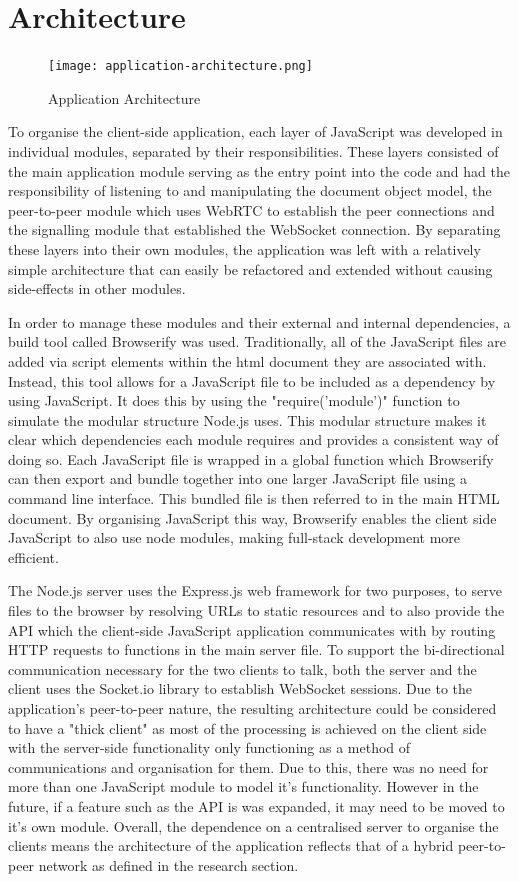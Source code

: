 \documentclass[]{report}
\begin{document}
		\section{Architecture}
			\begin{figure}[H]
				\caption{Application Architecture}
				\centering
				\texttt{[image: application-architecture.png]}
			\end{figure}
			To organise the client-side application, each layer of JavaScript was developed in individual modules, separated by their responsibilities. These layers consisted of the main application module serving as the entry point into the code and had the responsibility of listening to and manipulating the document object model, the peer-to-peer module which uses WebRTC to establish the peer connections and the signalling module that established the WebSocket connection. By separating these layers into their own modules, the application was left with a relatively simple architecture that can easily be refactored and extended without causing side-effects in other modules.
			
			In order to manage these modules and their external and internal dependencies, a build tool called Browserify was used. Traditionally, all of the JavaScript files are added via script elements within the html document they are associated with. Instead, this tool allows for a JavaScript file to be included as a dependency by using JavaScript. It does this by using the "require('module')" function to simulate the modular structure Node.js uses. This modular structure makes it clear which dependencies each module requires and provides a consistent way of doing so. Each JavaScript file is wrapped in a global function which Browserify can then export and bundle together into one larger JavaScript file using a command line interface. This bundled file is then referred to in the main HTML document. By organising JavaScript this way, Browserify enables the client side JavaScript to also use node modules, making full-stack development more efficient.
			
			The Node.js server uses the Express.js web framework for two purposes, to serve files to the browser by resolving URLs to static resources and to also provide the API which the client-side JavaScript application communicates with by routing HTTP requests to functions in the main server file. To support the bi-directional communication necessary for the two clients to talk, both the server and the client uses the Socket.io library to establish WebSocket sessions. Due to the application's peer-to-peer nature, the resulting architecture could be considered to have a "thick client" as most of the processing is achieved on the client side with the server-side functionality only functioning as a method of communications and organisation for them. Due to this, there was no need for more than one JavaScript module to model it's functionality. However in the future, if a feature such as the API is was expanded, it may need to be moved to it's own module. Overall, the dependence on a centralised server to organise the clients means the architecture of the application reflects that of a hybrid peer-to-peer network as defined in the research section.
						
\end{document}
